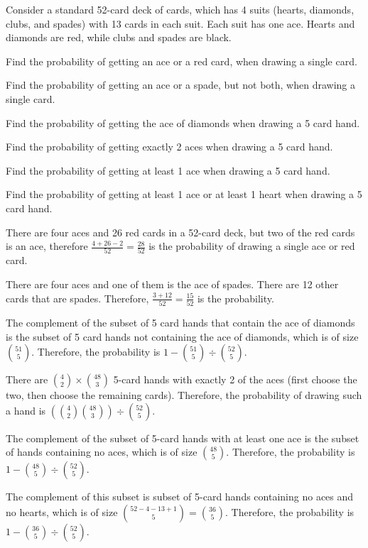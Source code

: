 \documentclass[11pt]{article}
\begin{document}

Consider a standard 52-card deck of cards, which has 4 suits (hearts, diamonds,
clubs, and spades) with 13 cards in each suit. Each suit has one ace. Hearts 
and diamonds are red, while clubs and spades are black. 
\begin{Parts}
    \Part Find the probability of getting an ace or a red card, when drawing a 
    single card.
    
    \Part Find the probability of getting an ace or a spade, but not both, when 
    drawing a single card.
    
    \Part Find the probability of getting the ace of diamonds when drawing a 5 
    card hand.
    
    \Part Find the probability of getting exactly 2 aces when drawing a 5 card 
    hand.
    
    \Part Find the probability of getting at least 1 ace when drawing a 5 card 
    hand.
    
    \Part Find the probability of getting at least 1 ace or at least 1 heart when 
    drawing a 5 card hand.
    
\end{Parts}

\begin{solution}

\begin{Parts}
\Part There are four aces and 26 red cards in a 52-card deck, but two of the red
cards is an ace, therefore $\frac{4 + 26 - 2}{52} = \frac{28}{52}$ is the 
probability of drawing a single ace or red card. 

\Part There are four aces and one of them is the ace of spades. There are 12 
other cards that are spades. Therefore, $\frac{3 + 12}{52} = \frac{15}{52}$
is the probability.

\Part The complement of the subset of 5 card hands that contain the ace of 
diamonds is the subset of 5 card hands not containing the ace of diamonds, 
which is of size $\binom{51}{5}$. Therefore, the probability is $1 - 
\binom{51}{5} \div \binom{52}{5}$. 

\Part There are $\binom{4}{2} \times \binom{48}{3}$ 5-card hands with exactly 2 
of the aces (first choose the two, then choose the remaining cards). Therefore,
the probability of drawing such a hand is $\left( \binom{4}{2} \binom{48}{3}
\right) \div \binom{52}{5}$. 

\Part The complement of the subset of 5-card hands with at least one ace is the
subset of hands containing no aces, which is of size $\binom{48}{5}$. Therefore,
the probability is $1 - \binom{48}{5} \div \binom{52}{5}$.

\Part The complement of this subset is subset of 5-card hands containing no aces
and no hearts, which is of size $\binom{52 - 4 - 13 + 1}{5} = \binom{36}{5}$.
Therefore, the probability is $1 - \binom{36}{5} \div \binom{52}{5}$.

\end{Parts}

\end{solution}
\end{document}
